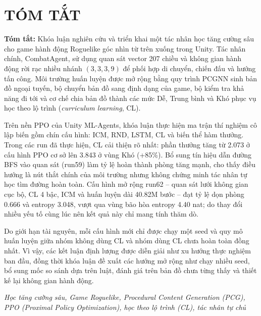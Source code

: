 \clearpage
{}

\chapter*{\fontsize{13}{13}\selectfont\textbf{TÓM TẮT}}

\noindent\textbf{Tóm tắt:} Khóa luận nghiên cứu và triển khai một tác nhân học tăng cường sâu cho game hành động Roguelike góc nhìn từ trên xuống trong Unity. Tác nhân chính, CombatAgent, sử dụng quan sát vector 207 chiều và không gian hành động rời rạc nhiều nhánh $(3,3,3,9)$ để phối hợp di chuyển, chiến đấu và hướng tấn công. Môi trường huấn luyện được mở rộng bằng quy trình PCGNN sinh bản đồ ngoại tuyến, bộ chuyển bản đồ sang định dạng của game, bộ kiểm tra khả năng đi tới và cơ chế chia bản đồ thành các mức Dễ, Trung bình và Khó phục vụ học theo lộ trình (\emph{curriculum learning}, CL).

Trên nền PPO của Unity ML-Agents, khóa luận thực hiện ma trận thí nghiệm cô lập biến gồm chín cấu hình: ICM, RND, LSTM, CL và biến thể hàm thưởng. Trong các run đã thực hiện, CL cải thiện rõ nhất: phần thưởng tăng từ 2.073 ở cấu hình PPO cơ sở lên 3.843 ở vùng Khó (+85\%). Bổ sung tín hiệu dẫn đường BFS vào quan sát (run59) làm tỷ lệ hoàn thành phòng tăng mạnh, cho thấy điều hướng là nút thắt chính của môi trường nhưng không chứng minh tác nhân tự học tìm đường hoàn toàn. Cấu hình mở rộng run62 -- quan sát lưới không gian cục bộ, CL 4 bậc, ICM và huấn luyện dài 40.82M bước -- đạt tỷ lệ dọn phòng 0.666 và entropy 3.048, vượt qua vùng bão hòa entropy 4.40 nat; do thay đổi nhiều yếu tố cùng lúc nên kết quả này chỉ mang tính thăm dò.

Do giới hạn tài nguyên, mỗi cấu hình mới chỉ được chạy một seed và quy mô huấn luyện giữa nhóm không dùng CL và nhóm dùng CL chưa hoàn toàn đồng nhất. Vì vậy, các kết luận định lượng được diễn giải như xu hướng thực nghiệm ban đầu, đồng thời khóa luận đề xuất các hướng mở rộng như chạy nhiều seed, bổ sung mốc so sánh dựa trên luật, đánh giá trên bản đồ chưa từng thấy và thiết kế lại không gian hành động.

\vspace{0.5cm}
 \textit{Học tăng cường sâu, Game Roguelike, Procedural Content Generation (PCG), PPO (Proximal Policy Optimization), học theo lộ trình (CL), tác nhân tự chủ}
